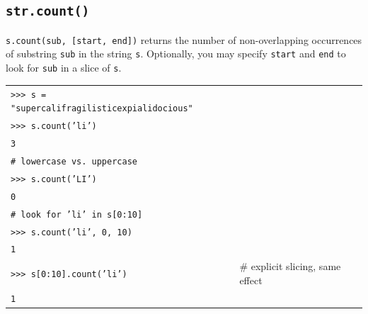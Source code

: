\documentclass[t,handout,9pt]{beamer}
\begin{document}
\subsection{\texttt{str.count()}}
\begin{frame}
\texttt{s.count(sub, [start, end])} returns the number of non-overlapping occurrences of substring \texttt{sub} in the string \texttt{s}. Optionally, you may specify \texttt{start} and \texttt{end} to look for \texttt{sub} in a slice of \texttt{s}.
\vfill
\begin{table}[]
\begin{flushleft}
\begin{tabular}{ll}
\texttt{>{}>{}> s = "supercalifragilisticexpialidocious"} &  \\
\texttt{>{}>{}> s.count('li')} &  \\
\texttt{3} &  \\
\texttt{\# lowercase vs. uppercase} &  \\
\texttt{>{}>{}> s.count('LI')} &  \\
\texttt{0} &  \\
\texttt{\# look for 'li' in s[0:10]} &  \\
\texttt{>{}>{}> s.count('li', 0, 10)} &  \\
\texttt{1} &  \\
\texttt{>{}>{}> s[0:10].count('li')} &  \# explicit slicing, same effect\\
\texttt{1} &  \\
\end{tabular}
\end{flushleft}
\end{table}
\vfill
\end{frame}
%
\end{document}
